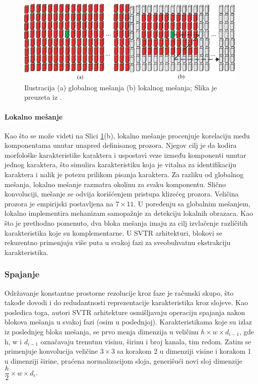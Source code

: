 \documentclass[a4paper,12pt]{article}
\begin{document}
	\begin{figure}[H]
		\centering
		\includegraphics[width=\textwidth]{assets/mixing-illustration.png}
		\caption{Ilustracija (a) globalnog mešanja (b) lokalnog mešanja; Slika je preuzeta iz \cite{du2022svtrscenetextrecognition}.}
		\label{fig:mixing-illustration}
	\end{figure}
	
	\paragraph{Lokalno mešanje}
	Kao što se može videti na Slici \ref{fig:mixing-illustration}(b), lokalno mešanje procenjuje korelaciju među komponentama unutar unapred definisanog prozora. Njegov cilj je da kodira morfološke karakteristike karaktera i uspostavi veze između komponenti unutar jednog karaktera, što simulira karakteristiku koja je vitalna za identifikaciju karaktera i nalik je potezu prilikom pisanja karaktera. Za razliku od globalnog mešanja, lokalno mešanje razmatra okolinu za svaku komponentu. Slično konvoluciji, mešanje se odvija korišćenjem pristupa klizećeg prozora. Veličina prozora je empirijski postavljena na \(7 \times 11\). U poređenju sa globalnim mešanjem, lokalno implementira mehanizam samopažnje za detekciju lokalnih obrazaca. Kao što je prethodno pomenuto, dva bloka mešanja imaju za cilj izvlačenje različitih karakteristika koje su komplementarne. U SVTR arhitekturi, blokovi se rekurentno primenjuju više puta u svakoj fazi za sveobuhvatnu ekstrakciju karakteristika.
	
	\subsubsection{Spajanje}
	Održavanje konstantne prostorne rezolucije kroz faze je računski skupo, što takođe dovodi i do redudantnosti reprezentacije karakteristika kroz slojeve. Kao posledica toga, autori SVTR arhitekture osmišljavaju operaciju spajanja nakon blokova mešanja u svakoj fazi (osim u poslednjoj). Karakteristikama koje su izlaz iz poslednjeg bloka mešanja, se prvo menja dimenzija u veličinu \(h \times w \times d_{i-1}\), gde h, w i \(d_{i-1}\) označavaju trenutnu visinu, širinu i broj kanala, tim redom. Zatim se primenjuje konvolucija veličine \(3 \times 3\) sa korakom 2 u dimenziji visine i korakom 1 u dimenziji širine, praćena normalizacijom sloja, generišući novi sloj dimenzije \(\dfrac{h}{2} \times w \times d_i\).
	
\end{document}
